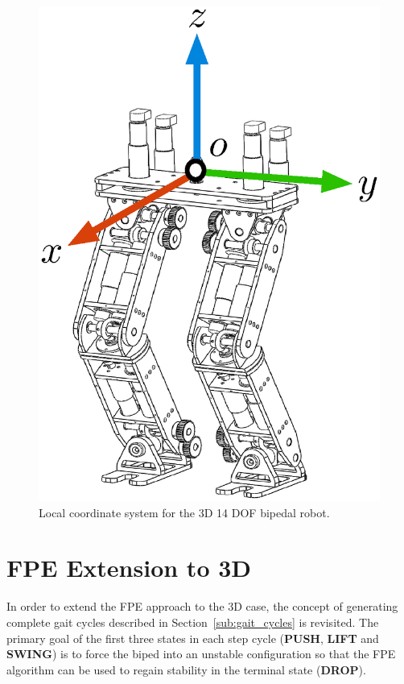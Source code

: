 \begin{figure}[!h]
	\centering
    \includegraphics[trim = 0mm 13mm 0mm 0mm,clip,scale=0.69]{fig/fpe/aslbiped.eps} 
  	\caption{Local coordinate system for the 3D 14 DOF bipedal robot.}
	\label{fig:bipedcoord}
\end{figure}


\section{FPE Extension to 3D} %
\label{sec:extension_to_3d}

In order to extend the FPE approach to the 3D case, the concept of generating complete gait cycles described in Section~\ref{sub:gait_cycles} is revisited. The primary goal of the first three states in each step cycle (\textbf{PUSH}, \textbf{LIFT} and \textbf{SWING}) is to force the biped into an unstable configuration so that the FPE algorithm can be used to regain stability in the terminal state (\textbf{DROP}).

